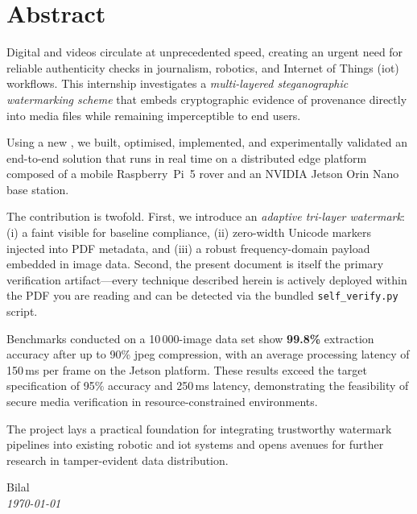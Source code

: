 \chapter*{Abstract}
Digital  and videos circulate at unprecedented speed, creating an
urgent need for reliable authenticity checks in journalism, robotics,
and Internet of Things (\gls{iot}) workflows.
This internship investigates a
\emph{multi-layered steganographic watermarking scheme} that embeds
cryptographic evidence of provenance directly into media files while
remaining imperceptible to end users.

Using a new , we built, optimised, implemented, and experimentally
validated an end-to-end solution that runs in real time on a distributed
edge platform composed of a mobile Raspberry~Pi~5 rover and an
NVIDIA\textsuperscript{\textregistered} Jetson Orin Nano\texttrademark{} base station.

The contribution is twofold.
First, we introduce an \emph{adaptive
tri-layer watermark}: (i) a faint visible  for baseline
compliance, (ii) zero-width Unicode markers injected into PDF metadata,
and (iii) a robust frequency-domain payload embedded in image data.
Second, the present document is itself the primary verification
artifact—every technique described herein is actively deployed within
the PDF you are reading and can be detected via the bundled
\texttt{self\_verify.py} script.

Benchmarks conducted on a 10\,000-image data set show \textbf{99.8\%}
extraction accuracy after up to 90\% \gls{jpeg} compression, with an average
processing latency of 150\,ms per frame on the Jetson platform.
These
results exceed the target specification of 95\% accuracy and 250\,ms
latency, demonstrating the feasibility of secure media verification in
resource-constrained environments.

The project lays a practical foundation for integrating trustworthy
watermark pipelines into existing robotic and \gls{iot} systems and opens
avenues for further research in tamper-evident data distribution.

\vspace{2em}
\begin{flushright}
    Bilal\\[2pt]            %
    \textit{\today}        %
\end{flushright}
